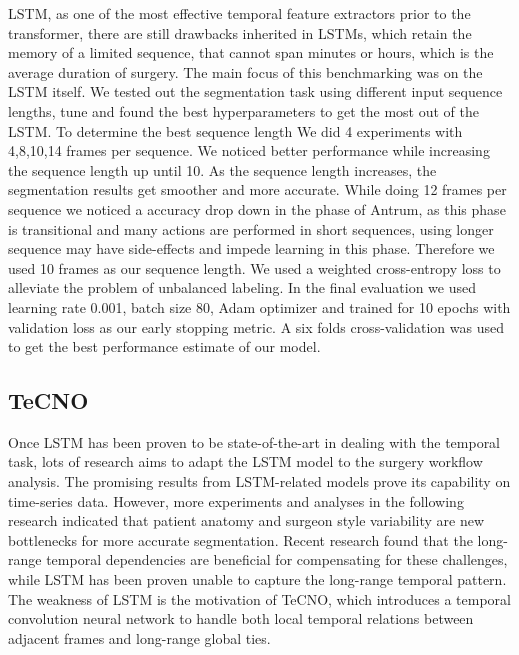 \documentclass[11pt]{article} \usepackage[top=1in, bottom=1in, left=1in, right=1in]{geometry}
\begin{document}
\vspace{0.25cm}
\noindent
LSTM, as one of the most effective temporal feature extractors prior to the transformer, there are still drawbacks inherited in LSTMs, which retain the memory of a limited sequence, that cannot span minutes or hours, which is the average duration of surgery. The main focus of this benchmarking was on the LSTM itself. We tested out the segmentation task using different input sequence lengths, tune and found the best hyperparameters to get the most out of the LSTM. To determine the best sequence length We did 4 experiments with 4,8,10,14 frames per sequence. We noticed better performance while increasing the sequence length up until 10. As the sequence length increases, the segmentation results get smoother and more accurate. While doing 12 frames per sequence we noticed a accuracy drop down in the phase of Antrum, as this phase is transitional and many actions are performed in short sequences, using longer sequence may have side-effects and impede learning in this phase. Therefore we used 10 frames as our sequence length. We used a weighted cross-entropy loss to alleviate the problem of unbalanced labeling. In the final evaluation we used learning rate 0.001, batch size 80, Adam optimizer and trained for 10 epochs with validation loss as our early stopping metric. A six folds cross-validation was used to get the best performance estimate of our model.

\subsection{TeCNO}
Once LSTM has been proven to be state-of-the-art in dealing with the temporal task, lots of research aims to adapt the LSTM model to the surgery workflow analysis. The promising results from LSTM-related models prove its capability on time-series data. However, more experiments and analyses in the following research indicated that patient anatomy and surgeon style variability are new bottlenecks for more accurate segmentation. Recent research found that the long-range temporal dependencies are beneficial for compensating for these challenges, while LSTM has been proven unable to capture the long-range temporal pattern. The weakness of LSTM is the motivation of TeCNO\cite{TeCNO}, which introduces a temporal convolution neural network to handle both local temporal relations between adjacent frames and long-range global ties. 
\end{document}
